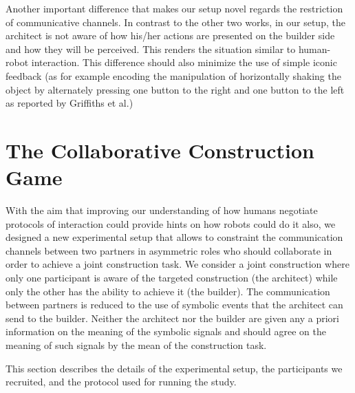 Another important difference that makes our setup novel regards the restriction of communicative channels. In contrast to the other two works, in our setup, the architect is not aware of how his/her actions are presented on the builder side and how they will be perceived. This renders the situation similar to human-robot interaction. This difference should also minimize the use of simple iconic feedback (as for example encoding the manipulation of horizontally shaking the object by alternately pressing one button to the right and one button to the left as reported by Griffiths et al.)


\section{The Collaborative Construction Game}

With the aim that improving our understanding of how humans negotiate protocols of interaction could provide hints on how robots could do it also, we designed a new experimental setup that allows to constraint the communication channels between two partners in asymmetric roles who should collaborate in order to achieve a joint construction task. We consider a joint construction where only one participant is aware of the targeted construction (the architect) while only the other has the ability to achieve it (the builder). The communication between partners is reduced to the use of symbolic events that the architect can send to the builder. Neither the architect nor the builder are given any a priori information on the meaning of the symbolic signals and should agree on the meaning of such signals by the mean of the construction task.

This section describes the details of the experimental setup, the participants we recruited, and the protocol used for running the study.


